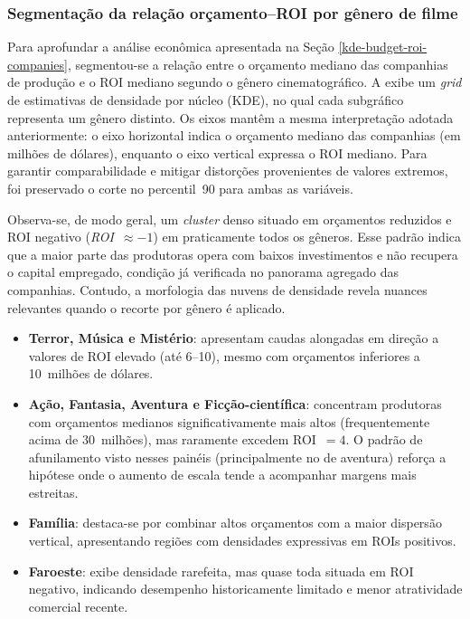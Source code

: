 \subsubsection{Segmentação da relação orçamento–ROI por gênero de filme}%
Para aprofundar a análise econômica apresentada na Seção \ref{kde-budget-roi-companies}, segmentou-se a relação entre o orçamento mediano das companhias de produção e o \acrshort{ROI} mediano segundo o gênero cinematográfico. A  exibe um \textit{grid} de estimativas de densidade por núcleo (KDE), no qual cada subgráfico representa um gênero distinto. Os eixos mantêm a mesma interpretação adotada anteriormente: o eixo horizontal indica o orçamento mediano das companhias (em milhões de dólares), enquanto o eixo vertical expressa o \acrshort{ROI} mediano. Para garantir comparabilidade e mitigar distorções provenientes de valores extremos, foi preservado o corte no percentil~90 para ambas as variáveis.

Observa-se, de modo geral, um \textit{cluster} denso situado em orçamentos reduzidos e \acrshort{ROI} negativo (\emph{ROI}~$\approx{-1}$) em praticamente todos os gêneros. Esse padrão indica que a maior parte das produtoras opera com baixos investimentos e não recupera o capital empregado, condição já verificada no panorama agregado das companhias. Contudo, a morfologia das nuvens de densidade revela nuances relevantes quando o recorte por gênero é aplicado.

\begin{itemize}
    \item \textbf{Terror, Música e Mistério}: apresentam caudas alongadas em direção a valores de \acrshort{ROI} elevado (até 6–10), mesmo com orçamentos inferiores a 10~milhões de dólares.
    \item \textbf{Ação, Fantasia, Aventura e Ficção-científica}: concentram produtoras com orçamentos medianos significativamente mais altos (frequentemente acima de 30~milhões), mas raramente excedem \acrshort{ROI}~$=4$. O padrão de afunilamento visto nesses painéis (principalmente no de aventura) reforça a hipótese onde o aumento de escala tende a acompanhar margens mais estreitas.
    \item \textbf{Família}: destaca-se por combinar altos orçamentos com a maior dispersão vertical, apresentando regiões com densidades expressivas em \acrshort{ROI}s positivos.
    \item \textbf{Faroeste}: exibe densidade rarefeita, mas quase toda situada em \acrshort{ROI} negativo, indicando desempenho historicamente limitado e menor atratividade comercial recente.
\end{itemize}

